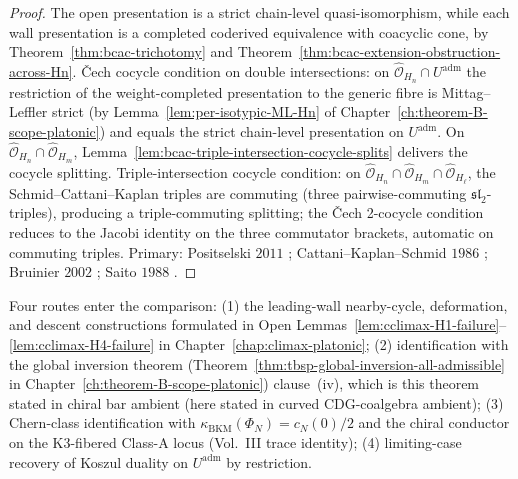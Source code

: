 \begin{proof}
The open presentation is a strict chain-level
quasi-isomorphism, while each wall presentation is a completed coderived
equivalence with coacyclic cone, by Theorem~\ref{thm:bcac-trichotomy}
and Theorem~\ref{thm:bcac-extension-obstruction-across-Hn}. \v Cech
cocycle condition on double
intersections: on $\widehat{\mathcal{O}}_{H_n}\cap U^{\mathrm{adm}}$
the restriction of the weight-completed presentation to the generic fibre
is Mittag--Leffler strict (by
Lemma~\ref{lem:per-isotypic-ML-Hn} of
Chapter~\ref{ch:theorem-B-scope-platonic}) and equals the strict
chain-level presentation on $U^{\mathrm{adm}}$. On
$\widehat{\mathcal{O}}_{H_n}\cap\widehat{\mathcal{O}}_{H_m}$,
Lemma~\ref{lem:bcac-triple-intersection-cocycle-splits} delivers
the cocycle splitting. Triple-intersection cocycle condition: on
$\widehat{\mathcal{O}}_{H_n}\cap\widehat{\mathcal{O}}_{H_m}
\cap\widehat{\mathcal{O}}_{H_\ell}$, the Schmid--Cattani--Kaplan
triples are commuting (three pairwise-commuting
$\mathfrak{sl}_2$-triples), producing a triple-commuting splitting;
the \v Cech 2-cocycle condition reduces to the Jacobi identity on
the three commutator brackets, automatic on commuting triples.
Primary: Positselski $2011$ \cite{Positselski11};
Cattani--Kaplan--Schmid $1986$ \cite{CattaniKaplanSchmid86};
Bruinier $2002$ \cite{Bruinier2002LNM};
Saito $1988$ \cite{Saito1988}.
\end{proof}

\begin{remark}
\label{rem:bcac-cech-descent-independent-checks}
Four routes enter the comparison: (1) the leading-wall nearby-cycle,
deformation, and descent constructions formulated in Open
Lemmas~\ref{lem:cclimax-H1-failure}--\ref{lem:cclimax-H4-failure}
in Chapter~\ref{chap:climax-platonic}; (2) identification
with the global inversion theorem
(Theorem~\ref{thm:tbsp-global-inversion-all-admissible} in
Chapter~\ref{ch:theorem-B-scope-platonic}) clause~(iv), which is
this theorem stated in chiral bar ambient (here stated in curved
CDG-coalgebra ambient); (3) Chern-class identification with
$\kappa_{\mathrm{BKM}}(\Phi_N)=c_N(0)/2$ and the chiral conductor
on the K3-fibered Class-A locus (Vol.~III trace identity);
(4) limiting-case
recovery of Koszul duality on $U^{\mathrm{adm}}$ by restriction.
\end{remark}
